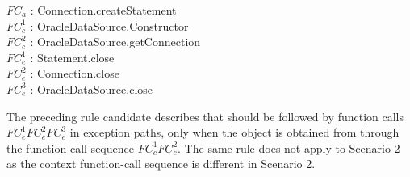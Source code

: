 \begin{CodeOut}
$FC_a$ : Connection.createStatement \\
\hspace*{0.3in}$FC_c^1$ : OracleDataSource.Constructor \\
\hspace*{0.3in}$FC_c^2$ : OracleDataSource.getConnection \\
\hspace*{0.3in}$FC_e^1$ : Statement.close \\
\hspace*{0.3in}$FC_e^2$ : Connection.close \\
\hspace*{0.3in}$FC_e^3$ : OracleDataSource.close
\end{CodeOut}

The preceding rule candidate describes that 
should be followed by function calls $FC_e^1$$FC_e^2$$FC_e^3$
in exception paths, only when the 
object is obtained from  through the function-call sequence
$FC_c^1$$FC_c^2$. The same rule does not apply to Scenario 2 as the context
function-call sequence is different in Scenario 2.

